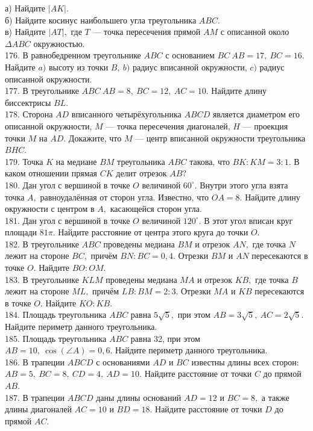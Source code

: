 \documentclass[12pt]{article}
\begin{document}
а) Найдите $|AK|.$\\
б) Найдите косинус наибольшего угла треугольника $ABC.$\\
в) Найдите $|AT|,$ где $T$ --- точка пересечения прямой $AM$ с описанной около $\Delta ABC$ окружностью.\\
176. В равнобедренном треугольнике $ABC$ с основанием $BC\ AB=17,\ BC=16.$ Найдите $a)$ высоту из точки $B,\ b)$ радиус вписанной окружности, $c)$ радиус описанной окружности.\\
177. В треугольнике $ABC\ AB=8,\ BC=12,\ AC=10.$ Найдите длину биссектрисы $BL.$\\
178. Сторона $AD$ вписанного четырёхугольника $ABCD$ является диаметром его описанной окружности, $M$ --- точка пересечения диагоналей, $H$ --- проекция точки $M$ на $AD.$ Докажите, что $M$ --- центр вписанной окружности треугольника $BHC.$\\
179. Точка $K$ на медиане $BM$ треугольника $ABC$ такова, что $BK:KM=3:1.$ В каком отношении прямая $CK$ делит отрезок $AB?$\\
180. Дан угол с вершиной в точке $O$ величиной $60^\circ.$ Внутри этого угла взята точка $A,$ равноудалённая от сторон угла. Известно, что $OA=8.$ Найдите длину окружности с центром в $A,$ касающейся сторон угла.\\
181. Дан угол с вершиной в точке $O$ величиной $120^\circ.$ В этот угол вписан круг площади $81\pi.$ Найдите расстояние от центра этого круга до точки $O.$\\
182. В треугольнике $ABC$ проведены медиана $BM$ и отрезок $AN,$ где точка $N$ лежит на стороне $BC,$ причём $BN:BC=0,4.$ Отрезки $BM$ и $AN$ пересекаются в точке $O.$ Найдите $BO:OM.$\\
183. В треугольнике $KLM$ проведены медиана $MA$ и отрезок $KB,$ где точка $B$ лежит на стороне $ML,$ причём $LB:BM=2:3.$ Отрезки $MA$ и $KB$ пересекаются в точке $O.$ Найдите $KO:KB.$\\
184. Площадь треугольника $ABC$ равна $5\sqrt{5},$ при этом $AB=3\sqrt{5},\ AC=2\sqrt{5}.$ Найдите периметр данного треугольника.\\
185. Площадь треугольника $ABC$ равна 32, при этом $AB=10,\ \cos(\angle A)=0,6.$ Найдите периметр данного треугольника.\\
186. В трапеции $ABCD$ с основаниями $AD$ и $BC$ известны длины всех сторон: $AB=5,\ BC=8,\ CD=4,\ AD=10.$ Найдите расстояние от точки $C$ до прямой $AB.$\\
187. В трапеции $ABCD$ даны длины оснований $AD=12$ и $BC=8,$ а также длины диагоналей $AC=10$ и $BD=18.$ Найдите расстояние от точки $D$ до прямой $AC.$\\
\end{document}
